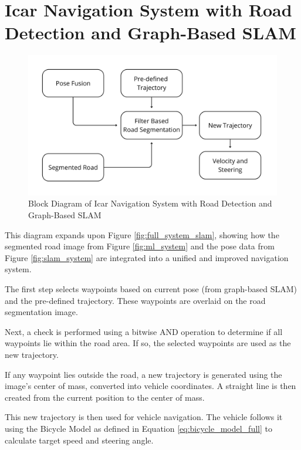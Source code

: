 \section{Icar Navigation System with Road Detection and Graph-Based SLAM} 
\begin{figure}[H]
	\centering
	\includegraphics[width=\linewidth]{../konten/nav_new_sys3.png}
	\caption{Block Diagram of Icar Navigation System with Road Detection and Graph-Based SLAM}
	\label{fig:nav_new_system}
\end{figure} 

This diagram expands upon Figure \ref{fig:full_system_slam}, showing how the segmented road image from Figure \ref{fig:ml_system} and the pose data from Figure \ref{fig:slam_system} are integrated into a unified and improved navigation system.

\par  
The first step selects waypoints based on current pose (from graph-based SLAM) and the pre-defined trajectory. These waypoints are overlaid on the road segmentation image.

\par   
Next, a check is performed using a bitwise AND operation to determine if all waypoints lie within the road area. If so, the selected waypoints are used as the new trajectory.

\par  
If any waypoint lies outside the road, a new trajectory is generated using the image’s center of mass, converted into vehicle coordinates. A straight line is then created from the current position to the center of mass.

\par 
This new trajectory is then used for vehicle navigation. The vehicle follows it using the Bicycle Model as defined in Equation \ref{eq:bicycle_model_full} to calculate target speed and steering angle.
